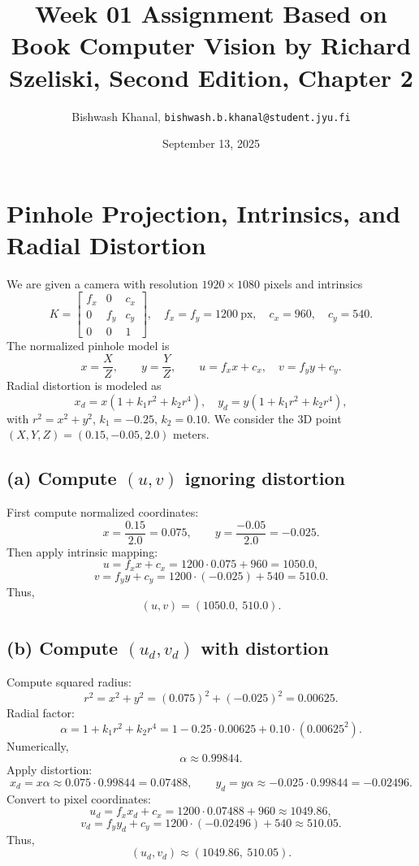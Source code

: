 \documentclass[12pt,a4paper]{article}
\title{Week 01 Assignment Based on Book Computer Vision by Richard Szeliski, Second Edition, Chapter 2}
\author{Bishwash Khanal, \texttt{bishwash.b.khanal@student.jyu.fi}}
\date{September 13, 2025}
\begin{document}
\maketitle

\section{Pinhole Projection, Intrinsics, and Radial Distortion}

We are given a camera with resolution $1920\times 1080$ pixels and intrinsics
\[
K = \begin{bmatrix}
f_x & 0 & c_x\\
0 & f_y & c_y\\
0 & 0 & 1
\end{bmatrix}, 
\quad f_x=f_y=1200~\text{px}, \quad c_x=960, \quad c_y=540.
\]
The normalized pinhole model is
\[
x = \frac{X}{Z}, \qquad y = \frac{Y}{Z}, \qquad 
u = f_x x + c_x, \quad v = f_y y + c_y.
\]
Radial distortion is modeled as
\[
x_d = x\!\left(1+k_1 r^2+k_2 r^4\right), \quad
y_d = y\!\left(1+k_1 r^2+k_2 r^4\right),
\]
with $r^2=x^2+y^2$, $k_1=-0.25$, $k_2=0.10$.  
We consider the 3D point $(X,Y,Z)=(0.15,-0.05,2.0)$ meters.

\subsection*{(a) Compute $(u,v)$ ignoring distortion}

First compute normalized coordinates:
\[
x = \frac{0.15}{2.0} = 0.075, \qquad
y = \frac{-0.05}{2.0} = -0.025.
\]
Then apply intrinsic mapping:
\[
u = f_x x + c_x = 1200\cdot0.075 + 960 = 1050.0,
\]
\[
v = f_y y + c_y = 1200\cdot(-0.025) + 540 = 510.0.
\]
Thus,
\[
(u,v) = (1050.0,\ 510.0).
\]

\subsection*{(b) Compute $(u_d,v_d)$ with distortion}

Compute squared radius:
\[
r^2 = x^2 + y^2 = (0.075)^2 + (-0.025)^2 = 0.00625.
\]
Radial factor:
\[
\alpha = 1 + k_1 r^2 + k_2 r^4 
= 1 - 0.25\cdot0.00625 + 0.10\cdot(0.00625^2).
\]
Numerically,
\[
\alpha \approx 0.99844.
\]
Apply distortion:
\[
x_d = x\alpha \approx 0.075 \cdot 0.99844 = 0.07488, \qquad
y_d = y\alpha \approx -0.025 \cdot 0.99844 = -0.02496.
\]
Convert to pixel coordinates:
\[
u_d = f_x x_d + c_x = 1200\cdot0.07488 + 960 \approx 1049.86,
\]
\[
v_d = f_y y_d + c_y = 1200\cdot(-0.02496) + 540 \approx 510.05.
\]
Thus,
\[
(u_d,v_d) \approx (1049.86,\ 510.05).
\]
\end{document}
